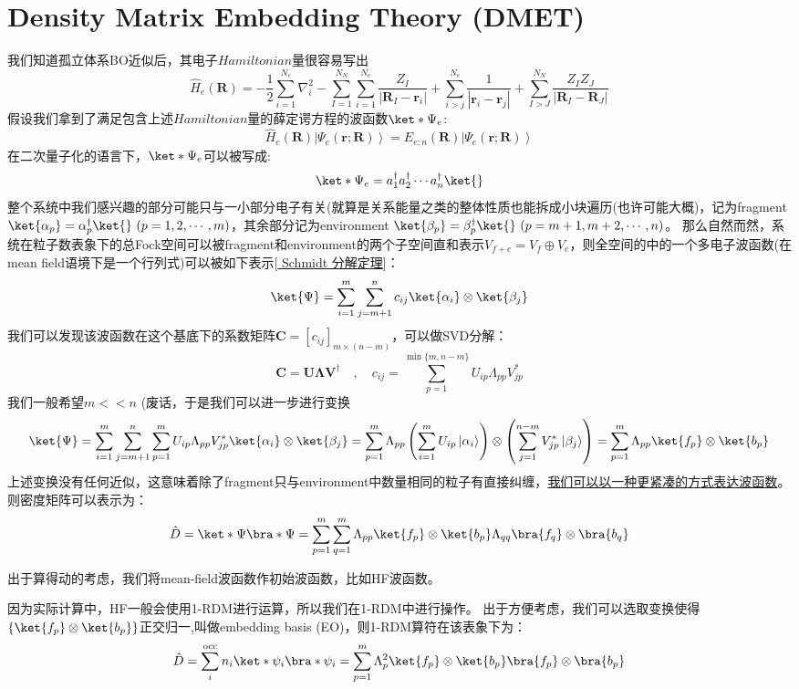 \section{Density Matrix Embedding Theory (DMET)}
我们知道孤立体系BO近似后，其电子$Hamiltonian$量很容易写出
\[\hat{H}_e(\mathbf{R})=-\frac{1}{2}\sum_{i=1}^{N_e}\nabla_i^2-\sum_{I=1}^{N_N}\sum_{i=1}^{N_e}\frac{Z_I}{|\mathbf{R}_I-\mathbf{r}_i|}+\sum_{i>j}^{N_e}\frac{1}{|\mathbf{r}_i-\mathbf{r}_j|}+\sum_{I>J}^{N_N}\frac{Z_IZ_J}{|\mathbf{R}_I-\mathbf{R}_J|} \tag{1}\]
假设我们拿到了满足包含上述$Hamiltonian$量的薛定谔方程的波函数$\ket*{\Psi_e}$:
\[\hat{H}_e(\mathbf{R})\left|\Psi_e(\mathbf{r};\mathbf{R})\right\rangle=E_{e;n}(\mathbf{R})\left|\Psi_e(\mathbf{r};\mathbf{R})\right\rangle \]
在二次量子化的语言下，$\ket*{\Psi_e}$可以被写成:
\[\ket*{\Psi_e}=a_1^{\dagger}a_2^{\dagger}\cdots a_n^{\dagger}\ket{}\]
整个系统中我们感兴趣的部分可能只与一小部分电子有关(就算是关系能量之类的整体性质也能拆成小块遍历(也许可能大概)，记为fragment $\ket{\alpha_p}=\alpha_p^{\dagger}\ket{} \ (p=1,2,\cdots,m)$，其余部分记为environment $\ket{\beta_p}=\beta_p^{\dagger}\ket{} \ (p=m+1,m+2,\cdots,n)$。
那么自然而然，系统在粒子数表象下的总Fock空间可以被fragment和environment的两个子空间直和表示$V_{f+e} = V_f \oplus V_e$，则全空间的中的一个多电子波函数(在mean field语境下是一个行列式)可以被如下表示[\href{https://zhuanlan.zhihu.com/p/86137107}{ Schmidt 分解定理}]：
\[\ket{\Psi}=\sum_{i=1}^{m}\sum_{j=m+1}^{n}c_{ij}\ket{\alpha_i}\otimes\ket{\beta_j}\]
我们可以发现该波函数在这个基底下的系数矩阵$\mathbf{C}=[c_{ij}]_{m \times (n-m)}$，可以做SVD分解：
\[\mathbf{C}=\mathbf{U}\mathbf{\Lambda}\mathbf{V}^{\dagger} \quad , \quad c_{ij}=\sum_{p=1}^{\min\{m,n-m\}}U_{ip}\Lambda_{pp}V_{jp}^*\]
我们一般希望$m<<n$ (废话，于是我们可以进一步进行变换
\[\ket{\Psi}=\sum_{i=1}^{m}\sum_{j=m+1}^{n}\sum_{p=1}^mU_{ip}\Lambda_{pp}V_{jp}^*\ket{\alpha_i}\otimes\ket{\beta_j}=\sum_{p=1}^{m}\Lambda_{pp}\left(\sum_{i=1}^{m}U_{ip}\left|\alpha_i\right>\right)\otimes\left(\sum_{j=1}^{n-m}V_{jp}^*\left|\beta_j\right>\right)=\sum_{p=1}^m\Lambda_{pp}\ket{f_p}\otimes\ket{b_p}\]
上述变换没有任何近似，这意味着除了fragment只与environment中数量相同的粒子有直接纠缠，\href{https://dspace.mit.edu/handle/1721.1/147265}{我们可以以一种更紧凑的方式表达波函数}。
则密度矩阵可以表示为：
\[\hat{D}=\ket*{\Psi}\bra*{\Psi} = \sum_{p=1}^m \sum_{q=1}^m \Lambda_{pp}\ket{f_p}\otimes\ket{b_p}\Lambda_{qq}\bra{f_q}\otimes\bra{b_q}\]

出于算得动的考虑，我们将mean-field波函数作初始波函数，比如HF波函数。

因为实际计算中，HF一般会使用1-RDM进行运算，所以我们在1-RDM中进行操作。
出于方便考虑，我们可以选取变换使得$\{\ket{f_p}\otimes\ket{b_p}\}$正交归一,叫做embedding basis (EO)，则1-RDM算符在该表象下为：
\[\hat{D}=\sum_i^{\text{occ}}n_i\ket*{\psi_i}\bra*{\psi_i} = \sum_{p=1}^m \Lambda_{p}^2\ket{f_p}\otimes\ket{b_p}\bra{f_p}\otimes\bra{b_p}\]

